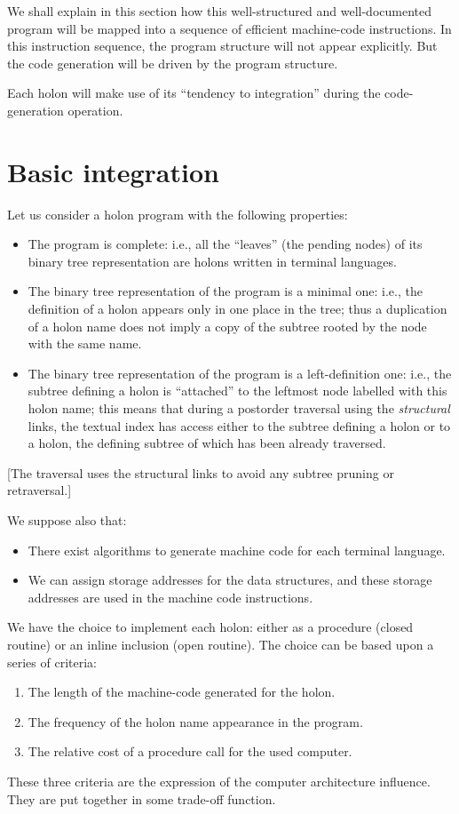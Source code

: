 \documentclass[openany,nobib]{tufte-book}
\begin{document}
We shall explain in this section how this well-structured and well-documented
program will be mapped into a sequence of efficient machine-code instructions.
In this instruction sequence, the program structure will not appear explicitly.
But the code generation will be driven by the program structure.

Each holon will make use of its ``tendency to integration'' during the
code-generation operation.

\section{Basic integration}
\label{sec:basic-integration}

Let us consider a holon program with the following properties:
\begin{itemize}
    \item[a.] The program is complete: i.e., all the ``leaves'' (the pending
nodes) of its binary tree representation are holons written in terminal
languages.
    \item[b.] The binary tree representation of the program is a minimal one:
i.e., the definition of a holon appears only in one place in the tree; thus a
duplication of a holon name does not imply a copy of the subtree rooted by the
node with the same name.
    \item[c.] The binary tree representation of the program is a
left-definition one: i.e., the subtree defining a holon is ``attached'' to the
leftmost node labelled with this holon name; this means that during a postorder
traversal using the {\it structural} links, the textual index has access either
to the subtree defining a holon or to a holon, the defining subtree of which
has been already traversed.
\end{itemize}
[The traversal uses the structural links to avoid any subtree pruning or
retraversal.]

\noindent We suppose also that:
\begin{itemize}
    \item[a.] There exist algorithms to generate machine code for each terminal
language.
    \item[b.] We can assign storage addresses for the data structures, and
these storage addresses are used in the machine code instructions.
\end{itemize}
We have the choice to implement each holon: either as a procedure (closed
routine) or an inline inclusion (open routine). The choice can be based upon a
series of criteria:
\begin{enumerate}
    \item The length of the machine-code generated for the holon.
    \item The frequency of the holon name appearance in the program.
    \item The relative cost of a procedure call for the used computer.
\end{enumerate}
These three criteria are the expression of the computer architecture influence.
They are put together in some trade-off function.
\end{document}
